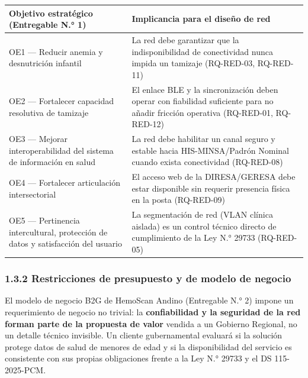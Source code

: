 \documentclass[11pt,a4paper]{article}
\begin{document}
{\small
\begin{longtable}[]{@{}
  >{\raggedright\arraybackslash}p{}
  >{\raggedright\arraybackslash}p{}@{}}
\toprule\noalign{}
\begin{minipage}[b]{\linewidth}\raggedright
Objetivo estratégico (Entregable N.° 1)
\end{minipage} & \begin{minipage}[b]{\linewidth}\raggedright
Implicancia para el diseño de red
\end{minipage} \\
\midrule\noalign{}
\endhead
\bottomrule\noalign{}
\endlastfoot
OE1 --- Reducir anemia y desnutrición infantil & La red debe garantizar que la indisponibilidad de conectividad nunca impida un tamizaje (RQ-RED-03, RQ-RED-11) \\
OE2 --- Fortalecer capacidad resolutiva de tamizaje & El enlace BLE y la sincronización deben operar con fiabilidad suficiente para no añadir fricción operativa (RQ-RED-01, RQ-RED-12) \\
OE3 --- Mejorar interoperabilidad del sistema de información en salud & La red debe habilitar un canal seguro y estable hacia HIS-MINSA/Padrón Nominal cuando exista conectividad (RQ-RED-08) \\
OE4 --- Fortalecer articulación intersectorial & El acceso web de la DIRESA/GERESA debe estar disponible sin requerir presencia física en la posta (RQ-RED-09) \\
OE5 --- Pertinencia intercultural, protección de datos y satisfacción del usuario & La segmentación de red (VLAN clínica aislada) es un control técnico directo de cumplimiento de la Ley N.° 29733 (RQ-RED-05) \\
\end{longtable}
}

\subsubsection{1.3.2 Restricciones de presupuesto y de modelo de negocio}\label{restricciones-de-presupuesto-y-de-modelo-de-negocio}

El modelo de negocio B2G de HemoScan Andino (Entregable N.° 2) impone un requerimiento de negocio no trivial: la \textbf{confiabilidad y la seguridad de la red forman parte de la propuesta de valor} vendida a un Gobierno Regional, no un detalle técnico invisible. Un cliente gubernamental evaluará si la solución protege datos de salud de menores de edad y si la disponibilidad del servicio es consistente con sus propias obligaciones frente a la Ley N.° 29733 y el DS 115-2025-PCM.
\end{document}
